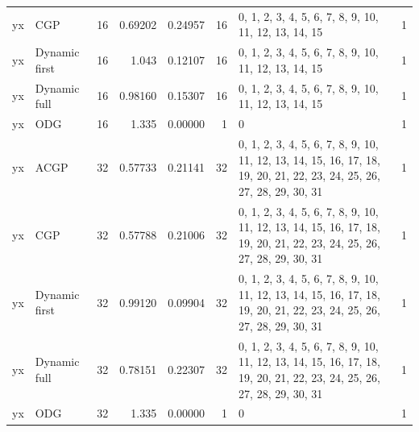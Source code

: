 \documentclass[10pt,a4paper]{article}
\begin{document}
\begin{longtable}{@{}p{23mm}p{29mm}rrrrp{36mm}r@{}}
yx & CGP & 16 & 0.69202 & 0.24957 & 16 & 0, 1, 2, 3, 4, 5, 6, 7, 8, 9, 10, 11, 12, 13, 14, 15 & 1 \\
yx & Dynamic first & 16 & 1.043 & 0.12107 & 16 & 0, 1, 2, 3, 4, 5, 6, 7, 8, 9, 10, 11, 12, 13, 14, 15 & 1 \\
yx & Dynamic full & 16 & 0.98160 & 0.15307 & 16 & 0, 1, 2, 3, 4, 5, 6, 7, 8, 9, 10, 11, 12, 13, 14, 15 & 1 \\
yx & ODG & 16 & 1.335 & 0.00000 & 1 & 0 & 1 \\
yx & ACGP & 32 & 0.57733 & 0.21141 & 32 & 0, 1, 2, 3, 4, 5, 6, 7, 8, 9, 10, 11, 12, 13, 14, 15, 16, 17, 18, 19, 20, 21, 22, 23, 24, 25, 26, 27, 28, 29, 30, 31 & 1 \\
yx & CGP & 32 & 0.57788 & 0.21006 & 32 & 0, 1, 2, 3, 4, 5, 6, 7, 8, 9, 10, 11, 12, 13, 14, 15, 16, 17, 18, 19, 20, 21, 22, 23, 24, 25, 26, 27, 28, 29, 30, 31 & 1 \\
yx & Dynamic first & 32 & 0.99120 & 0.09904 & 32 & 0, 1, 2, 3, 4, 5, 6, 7, 8, 9, 10, 11, 12, 13, 14, 15, 16, 17, 18, 19, 20, 21, 22, 23, 24, 25, 26, 27, 28, 29, 30, 31 & 1 \\
yx & Dynamic full & 32 & 0.78151 & 0.22307 & 32 & 0, 1, 2, 3, 4, 5, 6, 7, 8, 9, 10, 11, 12, 13, 14, 15, 16, 17, 18, 19, 20, 21, 22, 23, 24, 25, 26, 27, 28, 29, 30, 31 & 1 \\
yx & ODG & 32 & 1.335 & 0.00000 & 1 & 0 & 1 \\
\end{longtable}\normalsize\setlength{\tabcolsep}{6pt}
\clearpage
\end{document}
